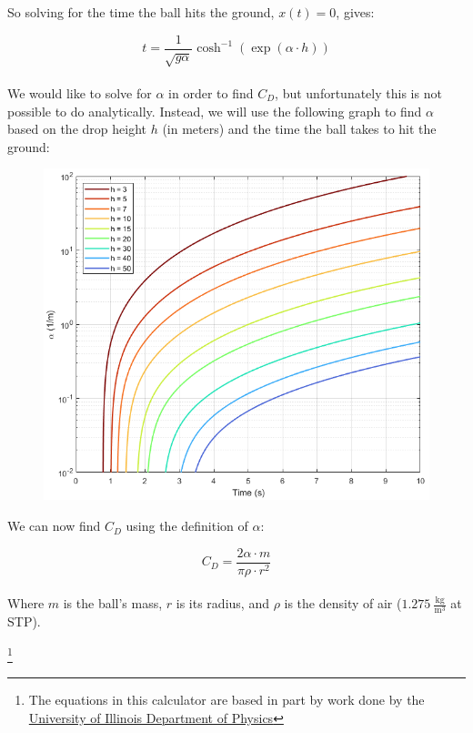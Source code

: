 \documentclass[a4paper]{article}
\newcommand\blfootnote[1]{%
	\begingroup
	\renewcommand\thefootnote{}\footnote{#1}%
	\addtocounter{footnote}{-1}%
	\endgroup
}
\begin{document}
	So solving for the time the ball hits the ground, $ x(t) = 0 $, gives:
	
	\begin{equation}
		t = \frac{1}{\sqrt{g \alpha}} \cosh^{-1} \left( \exp \left( \alpha \cdot h \right) \right)
	\end{equation}\\
	
	We would like to solve for $ \alpha $ in order to find $ C_D $, but unfortunately this is not possible to do analytically. Instead, we will use the following graph to find $ \alpha $ based on the drop height $ h $ (in meters) and the time the ball takes to hit the ground:
	
	\begin{figure}[H]
		\centering
		\includegraphics[width=\linewidth]{projectile_drag}
	\end{figure}
	
	We can now find $ C_D $ using the definition of $ \alpha $:
	
	\begin{equation}
		C_D = \frac{2\alpha \cdot m}{\pi \rho \cdot r^2}
	\end{equation}\\
	
	Where $ m $ is the ball's mass, $ r $ is its radius, and $ \rho $ is the density of air ($ 1.275\ \frac{\text{kg}}{\text{m}^3} $ at STP).
	
	
	\blfootnote{The equations in this calculator are based in part by work done by the \href{http://baseball.physics.illinois.edu/ajpfeb08.pdf}{University of Illinois Department of Physics}}
	
	
	
\end{document}

